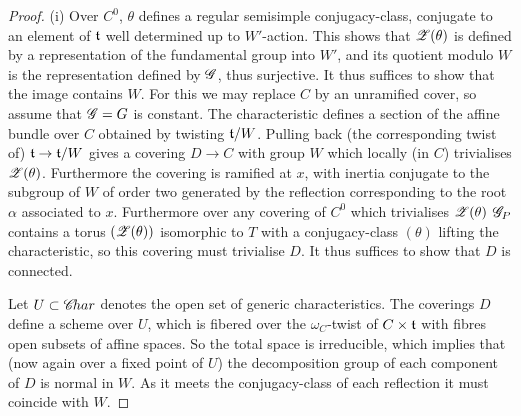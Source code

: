 \documentclass[12pt,english]{smfart}
\theoremstyle{plain} \newtheorem{innerthm}{Theorem} \newtheorem{innerlem}{Lemma} \newtheorem{innerprop}{Proposition} \newtheorem{innercor}{Corollary} \theoremstyle{definition} \newtheorem{innerdefn}{Definition} \newtheorem{innerconstr}{Construction} \theoremstyle{remark} \newtheorem*{remark}{Remark} \newtheorem*{remarks}{Remarks} \newtheorem*{applications}{Applications}
\begin{document}
\begin{proof}
(i) Over $C^0$, $\theta$ defines a regular semisimple conjugacy-class, conjugate to an element of $\mathfrak{t}$ well determined up to $W'$-action. This shows that $\mathscr{Z}(\theta)$ is defined by a representation of the fundamental group into $W'$, and its quotient modulo $W$ is the representation defined by $\mathscr{G}$, thus surjective. It thus suffices to show that the image contains $W$. For this we may replace $C$ by an unramified cover, so assume that $\mathscr{G}=G$ is constant. The characteristic defines a section of the affine bundle over $C$ obtained by twisting $\mathfrak{t}/W$. Pulling back (the corresponding twist of) $\mathfrak{t}\to\mathfrak{t}/W$ gives a covering $D\to C$ with group $W$ which locally (in $C$) trivialises $\mathscr{Z}(\theta)$. Furthermore the covering is ramified at $x$, with inertia conjugate to the subgroup of $W$ of order two generated by the reflection corresponding to the root $\alpha$ associated to $x$. Furthermore over any covering of $C^0$ which trivialises $\mathscr{Z}(\theta)$ $\mathscr{G}_P$ contains a torus $(\mathscr{Z}(\theta))$ isomorphic to $T$ with a conjugacy-class $(\theta)$ lifting the characteristic, so this covering must trivialise $D$. It thus suffices to show that $D$ is connected.

Let $U\subset\mathscr{C}\!har$ denotes the open set of generic characteristics. The coverings $D$ define a scheme over $U$, which is fibered over the $\omega_C$-twist of $C\times\mathfrak{t}$ with fibres open subsets of affine spaces. So the total space is irreducible, which implies that (now again over a fixed point of $U$) the decomposition group of each component of $D$ is normal in $W$. As it meets the conjugacy-class of each reflection it must coincide with $W$.


\end{proof}
\end{document}
